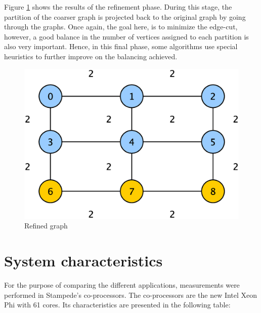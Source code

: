 \documentclass[abstract=on,9pt,twocolumn]{scrartcl}
\begin{document}
Figure \ref{img:refined_graph} shows the results of the refinement phase. During this stage, the partition of the coarser graph is projected back to the original graph by going through the graphs.\cite{Karypis:1998:FHQ:305219.305248}
Once again, the goal here, is to minimize the edge-cut, however, a good balance in the number of vertices assigned to each partition is also very important. Hence, in this final phase, some algorithms use special heuristics to further improve on the balancing achieved.
\begin{center}
  \begin{figure}[htb]
    \includegraphics[width=\columnwidth]{img/refinement.eps}
    \caption{Refined graph}
    \label{img:refined_graph} 
  \end{figure}
\end{center}



\section{System characteristics}
\label{sec:sys_char}
For the purpose of comparing the different applications, measurements
were performed in Stampede's co-processors. The co-processors are the
new Intel Xeon Phi with 61 cores. Its characteristics are presented in
the following table:
\end{document}
